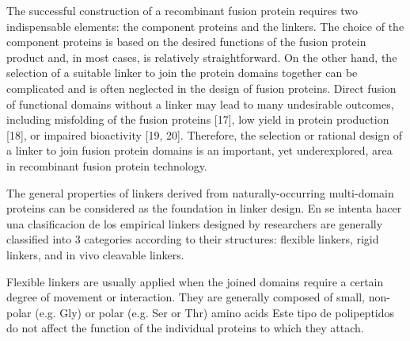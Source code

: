 The successful construction of a recombinant fusion protein requires two indispensable
elements: the component proteins and the linkers. The choice of the component proteins is
based on the desired functions of the fusion protein product and, in most cases, is relatively
straightforward. On the other hand, the selection of a suitable linker to join the protein
domains together can be complicated and is often neglected in the design of fusion proteins.
Direct fusion of functional domains without a linker may lead to many undesirable
outcomes, including misfolding of the fusion proteins [17], low yield in protein production
[18], or impaired bioactivity [19, 20]. Therefore, the selection or rational design of a linker
to join fusion protein domains is an important, yet underexplored, area in recombinant
fusion protein technology.

The general properties of linkers derived from naturally-occurring multi-domain proteins can be considered as the foundation in linker design. 
En \cite{chen2013fusion} se intenta hacer una clasificacion de los empirical linkers designed by researchers are generally classified into 3 categories according to their structures: flexible linkers, rigid linkers, and in vivo cleavable linkers. 




Flexible linkers are usually applied when the joined domains require a certain degree of movement or interaction. They are generally composed of small, non-polar (e.g. Gly) or polar (e.g. Ser or Thr) amino acids
Este tipo de polipeptidos do not affect the function of the individual proteins to which they attach. 

